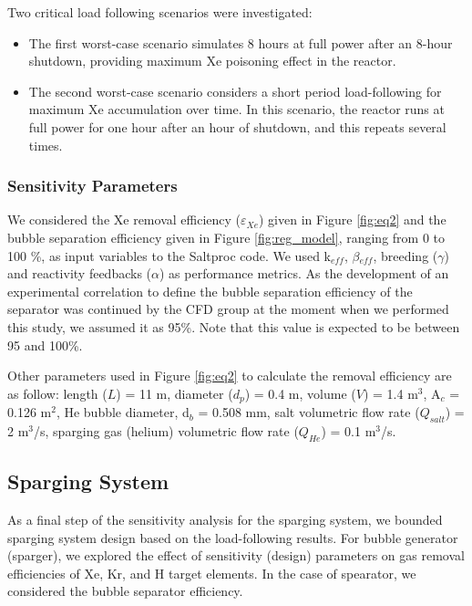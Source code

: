 \begin{itemize}
    Two critical load following scenarios were investigated:
    \begin{itemize}
        \item The first worst-case scenario simulates 8 hours at full power 
                after an 8-hour shutdown, providing maximum Xe poisoning effect 
                    in the reactor.
        \item The second worst-case scenario considers a short period 
                load-following for maximum Xe accumulation over time. In this 
                    scenario, the reactor runs at full power for one hour after 
                    an hour of shutdown, and this repeats several times.
    \end{itemize}

\subsubsection{Sensitivity Parameters}

    We considered the Xe removal efficiency ($\varepsilon$$_{Xe}$) given in 
    Figure \ref{fig:eq2} and the bubble separation efficiency given in Figure 
    \ref{fig:reg_model}, ranging from 0 to 100 \%, as input variables to the 
    Saltproc code. We used k$_{eff}$, $\beta$$_{eff}$, breeding ($\gamma$) and 
    reactivity feedbacks ($\alpha$) as performance metrics. As the development 
    of an experimental correlation to define the bubble separation efficiency 
    of the separator was continued by the CFD group at the moment when we 
    performed this study, we assumed it as 95\%. Note that this value is 
    expected to be between 95 and 100\%.

    Other parameters used in Figure \ref{fig:eq2} to calculate the removal 
    efficiency are as follow: length ($L$) = 11 m, diameter ($d_p$) = 0.4 m, 
    volume ($V$) = 1.4 m$^{3}$, A$_c$ = 0.126 m$^{2}$, He bubble diameter, 
    d$_b$ = 0.508 mm, salt volumetric flow rate ($Q_{salt}$) = 2 m$^{3}$/s, 
    sparging gas (helium) volumetric flow rate ($Q_{He}$) = 0.1 m$^{3}$/s.

\subsection{Sparging System}

    As a final step of the sensitivity analysis for the sparging system, we 
    bounded sparging system design based on the load-following results. For 
    bubble generator (sparger), we explored the effect of sensitivity (design) 
    parameters on gas removal efficiencies of Xe, Kr, and H target elements. In 
    the case of spearator, we considered the bubble separator efficiency.


\end{itemize}
